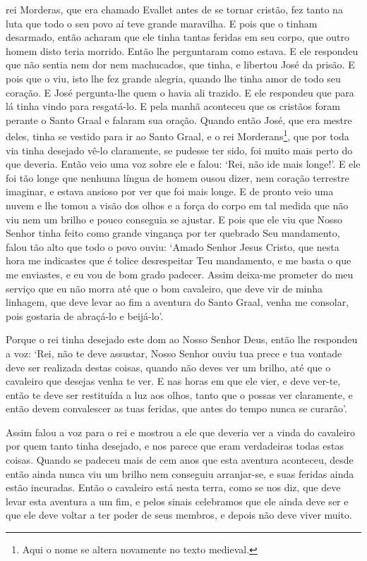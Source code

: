 rei Morderas, que era chamado Evallet antes de se tornar cristão, fez tanto na
luta que todo o seu povo aí teve grande maravilha. E pois que o tinham
desarmado, então acharam que ele tinha tantas feridas em seu corpo, que outro
homem disto teria morrido. Então lhe perguntaram como estava. E ele respondeu
que não sentia nem dor nem machucados, que tinha, e libertou José da prisão. E
pois que o viu, isto lhe fez grande alegria, quando lhe tinha amor de todo  seu
coração. E José pergunta-lhe quem o havia ali trazido. E ele respondeu que para
lá tinha vindo para resgatá-lo. E pela manhã aconteceu que os cristãos foram
perante o Santo Graal e falaram sua oração. Quando então José, que era mestre
deles, tinha se vestido para ir ao Santo Graal, e o rei Morderans\footnote{
Aqui o nome se altera novamente no texto medieval.},  que por toda
via tinha desejado vê-lo claramente, se pudesse ter sido, foi muito mais perto
do que deveria. Então veio uma voz sobre ele e falou: ‘Rei, não ide mais
longe!’. E ele foi tão longe que nenhuma língua de homem ousou dizer, nem
coração terrestre imaginar, e estava ansioso por ver que foi mais longe. E de
pronto veio uma nuvem e lhe tomou a visão dos olhos e a força do corpo em tal
medida que não viu nem um brilho e pouco conseguia se ajustar. E pois que ele
viu que Nosso Senhor tinha feito como grande vingança por ter quebrado Seu
mandamento, falou tão alto que todo o povo ouviu: ‘Amado Senhor Jesus Cristo,
que nesta hora me indicastes que é tolice desrespeitar Teu mandamento, e me
basta o que me enviastes, e eu vou de bom grado padecer. Assim
deixa-me prometer do meu serviço que eu não morra até que o bom cavaleiro, que
deve vir de minha linhagem, que deve levar ao fim a aventura do Santo Graal,
venha me consolar, pois gostaria de abraçá-lo e beijá-lo’. 

Porque o rei tinha desejado este dom ao Nosso Senhor Deus, então lhe
respondeu a voz: ‘Rei, não te deve assustar, Nosso Senhor ouviu tua prece e tua
vontade deve ser realizada destas coisas, quando não deves ver um brilho, até
que o cavaleiro que desejas venha te ver. E nas horas em que ele vier, e deve
ver-te, então te deve ser restituída a luz aos olhos, tanto que o possas ver
claramente, e então devem convalescer as tuas feridas, que antes do tempo nunca
se curarão’. 

Assim falou a voz para o rei e mostrou a ele que deveria ver a vinda do
cavaleiro por quem tanto tinha desejado, e nos parece que eram verdadeiras
todas estas coisas. Quando se padeceu mais de cem anos que esta aventura
aconteceu, desde então ainda nunca viu um brilho nem conseguiu arranjar-se, e
suas feridas ainda estão incuradas. Então o cavaleiro está nesta terra, como se
nos diz, que deve levar esta aventura a um fim, e pelos sinais celebramos que
ele ainda deve ser e que ele deve voltar a ter poder de seus membros, e depois
não deve viver muito. 


